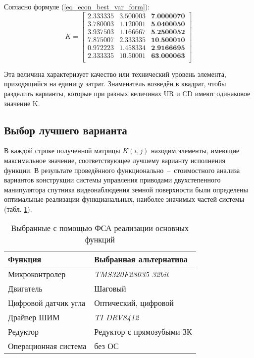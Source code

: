 Согласно формуле (\ref{eq_econ_best_var_form}):
\begin{equation}
    K =
        \begin{bmatrix}
            2.333335 & 3.500003 & \textbf{7.0000070} \\
            3.780003 & 1.120001 & \textbf{5.0400050} \\
            3.937503 & 1.166667 & \textbf{5.2500052} \\
            7.875007 & 2.333335 & \textbf{10.500010} \\
            0.972223 & 1.458334 & \textbf{2.9166695} \\
            2.333335 & 10.50001 & \textbf{63.000063} \\
        \end{bmatrix}
    \label{eq_econ_best_var}
\end{equation}

Эта величина характеризует качество или технический уровень
элемента, приходящийся на единицу затрат. Знаменатель возведён в квадрат,
чтобы разделить варианты, которые при разных величинах UR и CD имеют
одинаковое значение K.

\newpage
\subsection{Выбор лучшего варианта}
В каждой строке полученной матрицы $K(i, j)$ находим элементы,
имеющие максимальное значение, соответствующее лучшему варианту
исполнения функции.
В результате проведённого функционально~--~стоимостного анализа
вариантов конструкции системы управления приводами двухстепенного манипулятора
спутника видеонаблюдения земной поверхности были определены оптимальные
реализации функцианальных, наиболее значимых частей системы
(табл. \ref{tbl_econ_result}).

\begin{table}[ht!]
    \centering
    \begin{tabular}{|l|l|}
        \hline
        Функция & Выбранная альтернатива \\
        \hline
        \hline
        Микроконтролер & \textit{TMS320F28035 32bit} \\
        \hline
        Двигатель & Шаговый \\
        \hline
        Цифровой датчик угла & Оптический, цифровой \\
        \hline
        Драйвер ШИМ & \textit{TI DRV8412} \\
        \hline
        Редуктор & Редуктор с прямозубыми ЗК \\
        \hline
        Операционная система & без ОС \\
        \hline
    \end{tabular}
    \caption{Выбранные с помощью ФСА реализации основных функций}
    \label{tbl_econ_result}
\end{table}

